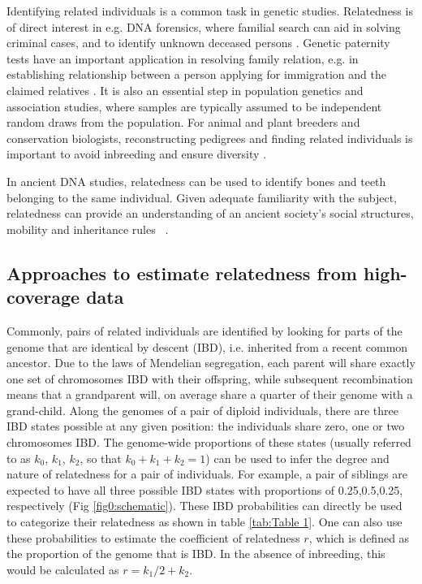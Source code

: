 \documentclass[12pt, letterpaper]{article}
\begin{document}
Identifying related individuals is a common task in genetic studies. Relatedness is of direct interest in e.g. DNA forensics, where familial search can aid in solving criminal cases, and to identify unknown deceased persons \cite{murphy_law_2018,ram_genealogy_2018}. Genetic paternity tests have an important application in resolving family relation, e.g. in establishing relationship between a person applying for immigration and the claimed relatives \cite{egeland_beyond_2000}. It is also an essential step in population genetics and association studies, where samples are typically assumed to be independent random draws from the population. For animal and plant breeders and conservation biologists, reconstructing pedigrees and finding related individuals is important to avoid inbreeding and ensure diversity \cite{habier_impact_2007,oliehoek_estimating_2006,kardos_measuring_2015}.

In ancient DNA studies, relatedness can be used to identify bones and teeth belonging to the same individual. Given adequate familiarity with the subject, relatedness can provide an understanding of an ancient society's social structures, mobility and inheritance rules ~\cite{baca_ancient_2012,mittnik_kinship-based_2019,sikora_ancient_2017}.


\subsection{Approaches to estimate relatedness from high-coverage data}

Commonly, pairs of related individuals are identified by looking for parts of the genome that are identical by descent (IBD), i.e. inherited from a recent common ancestor. Due to the laws of Mendelian segregation, each parent will share exactly one set of chromosomes IBD with their offspring, while subsequent recombination means that a grandparent will, on average share a quarter of their genome with a grand-child. Along the genomes of a pair of diploid individuals, there are three IBD states possible at any given position: the individuals share zero, one or two chromosomes IBD. The genome-wide proportions of these states (usually referred to as $k_0$, $k_1$, $k_2$, so that $k_0+k_1+k_2=1$) can be used to infer the degree and nature of relatedness for a pair of individuals. For example, a pair of siblings are expected to have all three possible IBD states with proportions of 0.25,0.5,0.25, respectively (Fig \ref{fig0:schematic}). These IBD probabilities can directly be used to categorize their relatedness as shown in table \ref{tab:Table 1}. One can also use these probabilities to estimate the coefficient of relatedness $r$, which is defined as the proportion of the genome that is IBD. In the absence of inbreeding, this would be calculated as $r= k_1/2 + k_2$.
\end{document}
